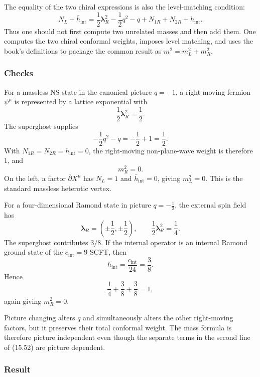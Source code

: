 \documentclass[
  10pt,
  a4paper,
  openany]{book}
\begin{document}
The equality of the two chiral expressions is also the level-matching
condition: \[
\boxed{
N_L+\bar h_{\mathrm{int}}
=
\frac12\boldsymbol\lambda_R^2
-\frac12q^2-q
+N_{1R}+N_{2R}
+h_{\mathrm{int}}.
}
\] Thus one should not first compute two unrelated masses and then add
them. One computes the two chiral conformal weights, imposes level
matching, and uses the book's definitions to package the common result
as \(m^2=m_L^2+m_R^2\).

\subsubsection{Checks}\label{checks-23}

For a massless NS state in the canonical picture \(q=-1\), a
right-moving fermion \(\psi^\mu\) is represented by a lattice
exponential with \[
\frac12\boldsymbol\lambda_R^2=\frac12.
\] The superghost supplies \[
-\frac12q^2-q
=
-\frac12+1
=
\frac12.
\] With \(N_{1R}=N_{2R}=h_{\mathrm{int}}=0\), the right-moving
non-plane-wave weight is therefore \(1\), and \[
m_R^2=0.
\] On the left, a factor \(\bar\partial X^\mu\) has \(N_L=1\) and
\(\bar h_{\mathrm{int}}=0\), giving \(m_L^2=0\). This is the standard
massless heterotic vertex.

For a four-dimensional Ramond state in picture \(q=-\frac12\), the
external spin field has \[
\boldsymbol\lambda_R
=
\left(\pm\frac12,\pm\frac12\right),
\qquad
\frac12\boldsymbol\lambda_R^2=\frac14.
\] The superghost contributes \(3/8\). If the internal operator is an
internal Ramond ground state of the \(c_{\mathrm{int}}=9\) SCFT, then \[
h_{\mathrm{int}}=\frac{c_{\mathrm{int}}}{24}=\frac38.
\] Hence \[
\frac14+\frac38+\frac38=1,
\] again giving \(m_R^2=0\).

Picture changing alters \(q\) and simultaneously alters the other
right-moving factors, but it preserves their total conformal weight. The
mass formula is therefore picture independent even though the separate
terms in the second line of (15.52) are picture dependent.

\subsubsection{Result}\label{result-27}
\end{document}
